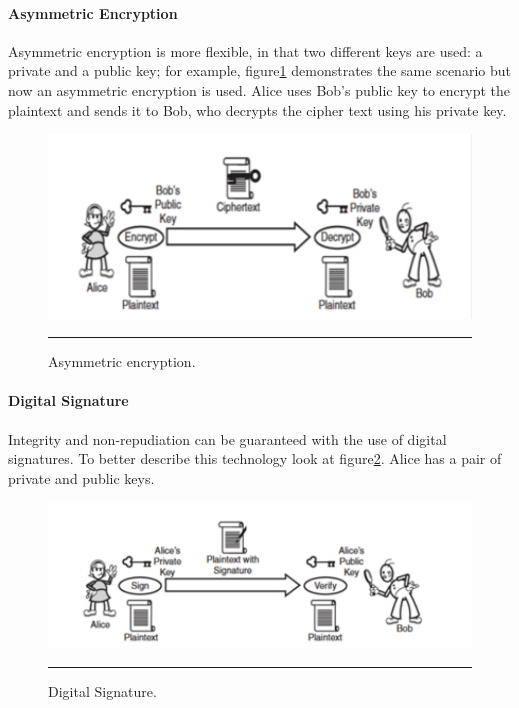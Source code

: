 \paragraph{Asymmetric Encryption}

Asymmetric encryption is more flexible, in that two different keys are used: a private and a public key; for example, figure\ref{fig:asymmetricEncryption} demonstrates the same scenario but now an asymmetric encryption is used. Alice uses Bob's public key to encrypt the plaintext and sends it to Bob, who decrypts the cipher text using his private key.

\begin{figure}[htbp]
	\centering
		\includegraphics{./Figures/figure13.pdf}
		\rule{35em}{0.5pt}
	\caption[Asymmetric Encryption]{Asymmetric encryption\cite{Graham:2001:BWS:559927}.}
	\label{fig:asymmetricEncryption}
\end{figure}

\paragraph{Digital Signature}

Integrity and non-repudiation can be guaranteed with the use of digital signatures. To better describe this technology look at figure\ref{fig:digitalSignature}. Alice has a pair of private and public keys.

\begin{figure}[htbp]
	\centering
		\includegraphics{./Figures/figure14.pdf}
		\rule{35em}{0.5pt}
	\caption[Digital Signature]{Digital Signature\cite{Graham:2001:BWS:559927}.}
	\label{fig:digitalSignature}
\end{figure}


